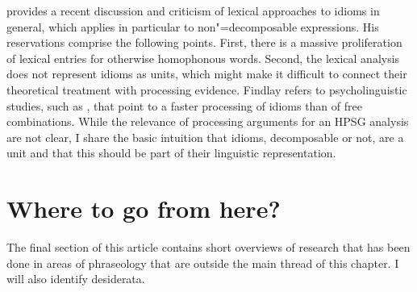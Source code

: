 \documentclass[output=paper
                ,modfonts
                ,nonflat
	        ,collection
	        ,collectionchapter
	        ,collectiontoclongg
 	        ,biblatex
                ,babelshorthands
                ,newtxmath
                ,draftmode
                ,colorlinks, citecolor=brown
]{./langsci/langscibook}
\begin{document}
\citet{Findlay:17} provides a recent discussion and criticism of lexical approaches to idioms in general, which applies in particular to non"=decomposable expressions. 
His reservations comprise the following points. 
First, there is a massive proliferation of lexical entries for otherwise homophonous words. 
%
Second, the lexical analysis does not represent idioms as units, which might make it difficult to connect their theoretical treatment with processing evidence. 
Findlay refers to psycholinguistic studies, such as \citet{Swinney:Cutler:79}, that point to a faster processing of idioms than of free combinations.
While the relevance of processing arguments for an HPSG analysis are not clear, I share the basic intuition that idioms, decomposable or not, are a unit and that this should be part of their linguistic representation.






\section{Where to go from here?}
\label{Sec-WhereToGo}

The final section of this article contains short overviews of research that has been done in areas of phraseology that are outside the main thread of this chapter. I will also identify desiderata. 
\end{document}

